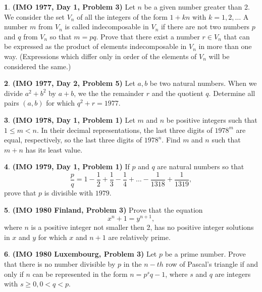 \documentclass{article}
\newcommand{\plus}{+}
\theoremstyle{definition}
\newtheorem{p}{}
\begin{document}
\begin{p}{\bf (IMO 1977, Day 1, Problem 3)}
Let $n$ be a given number greater than 2. We consider the set $V_n$ of all the integers of the form $1 + kn$ with $k = 1, 2, \ldots$ A number $m$ from $V_n$ is called indecomposable in $V_n$ if there are not two numbers $p$ and $q$ from $V_n$ so that $m = pq.$ Prove that there exist a number $r \in V_n$ that can be expressed as the product of elements indecomposable in $V_n$ in more than one way. (Expressions which differ only in order of the elements of $V_n$ will be considered the same.)
\end{p}



\begin{p}{\bf (IMO 1977, Day 2, Problem 5)}
Let $a,b$ be two natural numbers. When we divide $a^2+b^2$ by $a+b$, we the the remainder $r$ and the quotient $q.$ Determine all pairs $(a, b)$ for which $q^2 + r = 1977.$
\end{p}












\begin{p}{\bf (IMO 1978, Day 1, Problem 1)}
Let $ m$ and $ n$ be positive integers such that $ 1 \le m < n$.  In their decimal representations, the last three digits of $ 1978^m$ are equal, respectively, so the last three digits of $ 1978^n$.  Find $ m$ and $ n$ such that $ m \plus{} n$ has its least value.
\end{p}





\begin{p}{\bf (IMO 1979, Day 1, Problem 1)}
If $p$ and $q$ are natural numbers so that \[ \frac{p}{q}=1-\frac{1}{2}+\frac{1}{3}-\frac{1}{4}+ \ldots -\frac{1}{1318}+\frac{1}{1319}, \] prove that $p$ is divisible with $1979$.
\end{p}




\begin{p}{\bf (IMO 1980 Finland, Problem 3)}
Prove that the equation \[ x^n + 1 = y^{n+1}, \] where $n$ is a positive integer not smaller then 2, has no positive integer solutions in $x$ and $y$ for which $x$ and $n+1$ are relatively prime.
\end{p}



\begin{p}{\bf (IMO 1980 Luxembourg, Problem 3)}
Let $p$ be a prime number. Prove that there is no number divisible by $p$ in the $n-th$ row of Pascal's triangle if and only if $n$ can be represented in the form $n = p^sq - 1$, where $s$ and $q$ are integers with $s \geq 0, 0 < q < p$.
\end{p}
\end{document}
